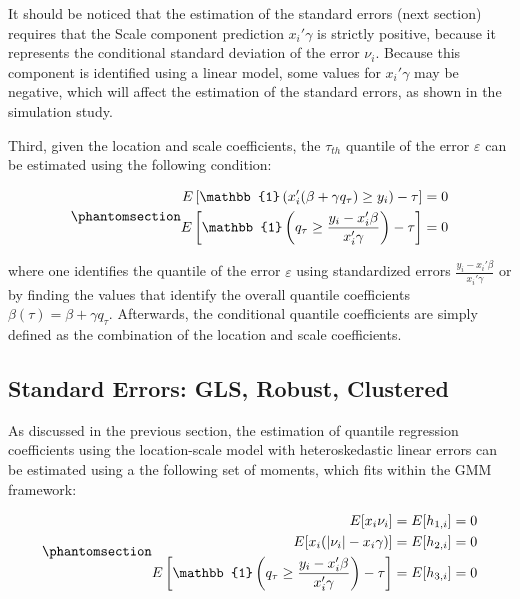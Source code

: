\documentclass[
  12pt,
  oneside]{article}
\begin{document}
It should be noticed that the estimation of the standard errors (next
section) requires that the Scale component prediction \(x_i'\gamma\) is
strictly positive, because it represents the conditional standard
deviation of the error \(\nu_i\). Because this component is identified
using a linear model, some values for \(x_i'\gamma\) may be negative,
which will affect the estimation of the standard errors, as shown in the
simulation study.

Third, given the location and scale coefficients, the \(\tau_{th}\)
quantile of the error \(\varepsilon\) can be estimated using the
following condition:

\begin{equation}\phantomsection\label{eq-eq9}{\begin{aligned}
  E\left[  \mathbb{1}\left(x_i' (\beta +   \gamma q_\tau) \geq y_i \right) - \tau \right] &=0  \\
  E\left[  \mathbb{1}\left(   q_\tau \geq \frac{y_i-x_i'\beta}{x_i'\gamma} \right) - \tau \right] &=0  \\
  \end{aligned}
}\end{equation}

where one identifies the quantile of the error \(\varepsilon\) using
standardized errors \(\frac{y_i-x_i'\beta}{x_i'\gamma}\) or by finding
the values that identify the overall quantile coefficients
\(\beta(\tau)=\beta + \gamma q_\tau\). Afterwards, the conditional
quantile coefficients are simply defined as the combination of the
location and scale coefficients.

\subsection{Standard Errors: GLS, Robust, Clustered}\label{sec-se}

As discussed in the previous section, the estimation of quantile
regression coefficients using the location-scale model with
heteroskedastic linear errors can be estimated using a the following set
of moments, which fits within the GMM framework:

\begin{equation}\phantomsection\label{eq-eq10}{\begin{aligned}
  E[x_i \nu_i  ] &= E[h_{1,i}]=0 \\
  E[x_i  (|\nu_i|-x_i \gamma) ] &=E[h_{2,i}]=0 \\
  E\left[  \mathbb{1}\left(   q_\tau\geq \frac{y_i-x_i'\beta}{x_i'\gamma} \right) - \tau \right]  &=E[h_{3,i}]=0 
  \end{aligned}
}\end{equation}
\end{document}
